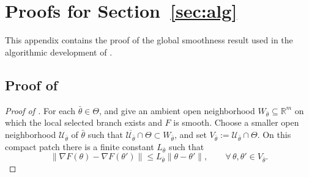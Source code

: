 \documentclass{article}
\theoremstyle{normaltheorem}
\newcommand{\R}{\mathbb{R}}
\begin{document}
\section{Proofs for Section~\ref{sec:alg}}\label{append:alg-proofs}
This appendix contains the proof of the global smoothness result used in the algorithmic development of .

\subsection{Proof of }\label{append:F-smooth-proof}
\begin{proof}[Proof of ]
For each $\bar\theta\in\Theta$,  and  give an ambient open neighborhood
$W_{\bar\theta}\subseteq\R^m$ on which the local selected branch exists and $F$ is smooth.
Choose a smaller open neighborhood $\mathcal U_{\bar\theta}$ of $\bar\theta$ such that
$\overline{\mathcal U_{\bar\theta}}\cap\Theta\subset W_{\bar\theta}$, and set
$V_{\bar\theta}:=\mathcal U_{\bar\theta}\cap\Theta$.
On this compact patch there is a finite constant $L_{\bar\theta}$ such that
\begin{equation}\label{eq:local-smoothness-cover}
\|\nabla F(\theta)-\nabla F(\theta')\|
\le
L_{\bar\theta}\|\theta-\theta'\|,
\qquad
\forall\,\theta,\theta'\in V_{\bar\theta}.
\end{equation}


\end{proof}
\end{document}
